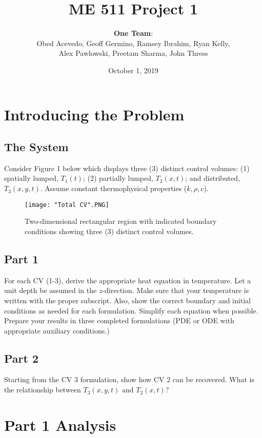 \documentclass{article}
\title{\textbf{ME 511 Project 1}}
\author{\textbf{One Team}: \\ Obed Acevedo, Geoff Germino, Ramsey Ibrahim, Ryan Kelly, \\ Alex Pawlowski, Preetam Sharma, John Thress}
\date{October 1, 2019}
\begin{document}
\maketitle

\section{Introducing the Problem}

\subsection*{The System} 
Consider Figure 1 below which displays three (3) distinct control volumes: (1) spatially lumped, $T_1(t)$; (2) partially lumped, $T_2(x,t)$; and distributed, $T_3(x,y,t)$. Assume constant thermophysical properties ($k,\rho,c$).

\begin{figure}[ht!]
    \centering
    \texttt{[image: "Total CV".PNG]} 
    \caption{Two-dimensional rectangular region with indicated boundary conditions showing three (3) distinct control volumes.}
    \label{fig:figure1}
\end{figure}

\subsection*{Part 1}
For each CV (1-3), derive the appropriate heat equation in temperature. Let a unit depth be assumed in the $z$-direction. Make sure that your temperature is written with the proper subscript. Also, show the correct boundary and initial conditions as needed for each formulation. Simplify each equation when possible. Prepare your results in three completed formulations (PDE or ODE with appropriate auxiliary conditions.)

\subsection*{Part 2}
Starting from the CV 3 formulation, show how CV 2 can be recovered. What is the relationship between $T_3(x,y,t)$ and $T_2(x,t)$?

\section{Part 1 Analysis}
\end{document}
